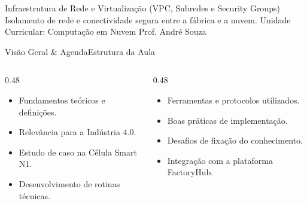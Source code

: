 
\senaicover
  {Infraestrutura de Rede e Virtualização (VPC, Subredes e Security Groups)}
  {Isolamento de rede e conectividade segura entre a fábrica e a nuvem.}
  {Unidade Curricular: Computação em Nuvem}
  {Prof. André Souza}

\begin{senaiframe}{Visão Geral \& Agenda}{Estrutura da Aula}
  \begin{columns}[t]
    \begin{column}{0.48\textwidth}
      \begin{tcolorbox}[senaibluecard, title={1. Conceitos Chave}]
        \begin{itemize}
          \item Fundamentos teóricos e definições.
          \item Relevância para a Indústria 4.0.
        \end{itemize}
      \end{tcolorbox}
      \vspace{4pt}
      \begin{tcolorbox}[senaiambercard, title={3. Aplicação Prática}]
        \begin{itemize}
          \item Estudo de caso na Célula Smart N1.
          \item Desenvolvimento de rotinas técnicas.
        \end{itemize}
      \end{tcolorbox}
    \end{column}
    \begin{column}{0.48\textwidth}
      \begin{tcolorbox}[senairedcard, title={2. Detalhamento Técnico}]
        \begin{itemize}
          \item Ferramentas e protocolos utilizados.
          \item Boas práticas de implementação.
        \end{itemize}
      \end{tcolorbox}
      \vspace{4pt}
      \begin{tcolorbox}[senaigreencard, title={4. Exercícios \& Avaliação}]
        \begin{itemize}
          \item Desafios de fixação do conhecimento.
          \item Integração com a plataforma FactoryHub.
        \end{itemize}
      \end{tcolorbox}
    \end{column}
  \end{columns}
\end{senaiframe}

